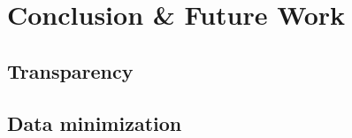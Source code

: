 \chapter{Conclusion \& Future Work}
\label{conclude}

\section{Transparency}
\section{Data minimization}

